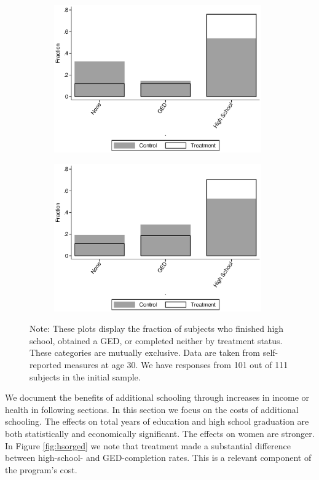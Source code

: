 \begin{figure}[H]
\begin{center}
\caption{High School and GED} \label{fig:hsorged}
\begin{subfigure}{.5\textwidth}
\label{subfig:hs_stat_female}
\includegraphics[height=2.5in]{AppOutput/Education/hsorged_female_age30.eps}
\end{subfigure}
\begin{subfigure}{.5\textwidth}
\label{subfig:hs_stat_male}
\includegraphics[height=2.5in]{AppOutput/Education/hsorged_male_age30.eps}
\end{subfigure}
{\footnotesize \flushleft Note: These plots display the fraction of subjects who finished high school, obtained a GED, or completed neither by treatment status. These categories are mutually exclusive. Data are taken from self-reported measures at age 30. We have responses from 101 out of 111 subjects in the initial sample.\\}
\end{center}
\end{figure}

\noindent We document the benefits of additional schooling through increases in income or health in following sections. In this section we focus on the costs of additional schooling. The effects on total years of education and high school graduation are both statistically and economically significant. The effects on women are stronger. In Figure \ref{fig:hsorged} we note that treatment made a substantial difference between high-school- and GED-completion rates. This is a relevant component of the program's cost. \\

